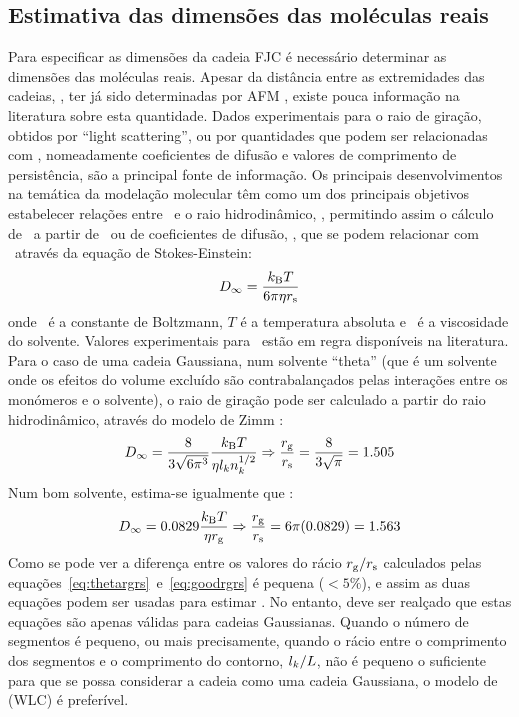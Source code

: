 \subsection{Estimativa das dimensões das moléculas reais}
%
%
Para especificar as dimensões da cadeia FJC é necessário determinar as dimensões das moléculas reais. Apesar da distância entre as extremidades das cadeias, \distanciah, ter já sido determinadas por AFM \cite{lail}, existe pouca informação na literatura sobre esta quantidade. Dados experimentais para o raio de giração, obtidos por ``light scattering'', ou por quantidades que podem ser relacionadas com \raiogiracao, nomeadamente coeficientes de difusão e valores de comprimento de persistência, são a principal fonte de informação. Os principais desenvolvimentos na temática da modelação molecular têm como um dos principais objetivos estabelecer relações entre \raiogiracao\ e o raio hidrodinâmico, \raiostokes, permitindo assim o cálculo de \raiogiracao\ a partir de \raiostokes\ ou de coeficientes de difusão, \dinf, que se podem relacionar com \raiostokes\ através da equação de Stokes-Einstein:
\begin{equation}
\label{eq:art1se}
D_{\mathit{\infty}}=\frac{k_{\mathrm{B}} T}{6\pi\eta r_{\mathrm{s}}}
\end{equation}
onde \boltzman\ é a constante de Boltzmann, $T$ é a temperatura absoluta e \viscosidade\ é a viscosidade do solvente. Valores experimentais para \dinf\ estão em regra disponíveis na literatura. Para o caso de uma cadeia Gaussiana, num solvente ``theta'' (que é um solvente onde os efeitos do volume excluído são contrabalançados pelas interações entre os monómeros e o solvente), o raio de giração pode ser calculado a partir do raio hidrodinâmico, através do modelo de Zimm \cite{teraoka,fukatsu,robertson}:
%
%
\begin{equation}
\label{eq:thetargrs}
D_{\mathit{\infty}}=\frac{8}{3\sqrt{6\pi^{3}}}\frac{k_{\mathrm{B}} T}{\eta l_{k}n_{k}^{1/2}}\Rightarrow\frac{r_{\mathrm{g}}}{r_{\mathrm{s}}}=\frac{8}{3\sqrt{\pi}}=1.505
\end{equation}
Num bom solvente, estima-se igualmente que \cite{teraoka,oono}:
%
\begin{equation}
\label{eq:goodrgrs}
D_{\mathit{\infty}}=0.0829\frac{k_{\mathrm{B}} T}{\eta r_{\mathrm{g}}}\Rightarrow \frac{r_{\mathrm{g}}}{r_{\mathrm{s}}}=6\pi(0.0829)=1.563
\end{equation}
Como se pode ver a diferença entre os valores do rácio $r_{\mathrm{g}}/r_{\mathrm{s}}$ calculados pelas equações~\ref{eq:thetargrs}~e~\ref{eq:goodrgrs} é pequena ($<5\%$), e assim as duas equações podem ser usadas para estimar \raiogiracao. No entanto, deve ser realçado que estas equações são apenas válidas para cadeias Gaussianas. Quando o número de segmentos é pequeno, ou mais precisamente, quando o rácio entre o comprimento dos segmentos e o comprimento do contorno, $l_{k}/L$, não é pequeno o suficiente para que se possa considerar a cadeia como uma cadeia Gaussiana, o modelo de \wlc (WLC) \cite{teraoka,sunbook} é preferível.
